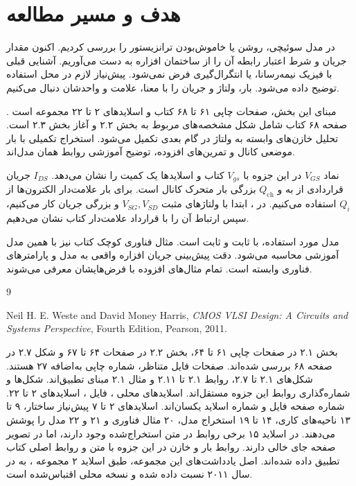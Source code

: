 \documentclass[12pt,a4paper]{article}
\newcommand{\secnum}[1]{\mbox{\beginL#1\endL}}
\begin{document}
\MakeAssignmentCover
\section*{هدف و مسیر مطالعه}
در مدل سوئیچی، روشن یا خاموش‌بودن ترانزیستور را بررسی کردیم. اکنون مقدار جریان
و شرط اعتبار رابطه آن را از ساختمان افزاره به دست می‌آوریم. آشنایی قبلی با
فیزیک نیمه‌رسانا،  یا انتگرال‌گیری فرض نمی‌شود.
پیش‌نیاز لازم در محل استفاده توضیح داده می‌شود. بار، ولتاژ و جریان را با معنا،
علامت و واحدشان دنبال می‌کنیم.

مبنای این بخش، صفحات چاپی ۶۱ تا ۶۸ کتاب و اسلایدهای ۲ تا ۲۲ مجموعه 
است \cite{weste,mos}. صفحه ۶۸ کتاب شامل شکل مشخصه‌های مربوط به بخش
\secnum{۲.۲} و آغاز بخش \secnum{۲.۳} است. تحلیل خازن‌های وابسته به ولتاژ در گام
بعدی تکمیل می‌شود. استخراج تکمیلی با بار موضعی کانال و تمرین‌های افزوده، توضیح
آموزشی روابط همان مدل‌اند.

نماد \(V_{GS}\) در این جزوه با \(V_{gs}\) کتاب و اسلایدها یک کمیت را نشان می‌دهد.
\(I_{DS}\) جریان قراردادی از  به  و \(Q_{\mathrm{ch}}\)
بزرگی بار متحرک کانال است. برای بار علامت‌دار الکترون‌ها از \(Q_i\) استفاده می‌کنیم.
در ، ابتدا با ولتاژهای مثبت \(V_{SG},V_{SD}\) و بزرگی جریان کار می‌کنیم،
سپس ارتباط آن را با قرارداد علامت‌دار کتاب نشان می‌دهیم.

مدل مورد استفاده،  با  ثابت و 
ثابت است. مثال فناوری کوچک کتاب نیز با همین مدل آموزشی محاسبه می‌شود.
دقت پیش‌بینی جریان افزاره واقعی به مدل و پارامترهای فناوری وابسته است.
تمام مثال‌های افزوده با فرض‌هایشان معرفی می‌شوند.
\tableofcontents
\clearpage


\begin{thebibliography}{9}
\begin{latin}
Neil H. E. Weste and David Money Harris,
\textit{CMOS VLSI Design: A Circuits and Systems Perspective},
Fourth Edition, Pearson, 2011.
\end{latin}
بخش \secnum{۲.۱} در صفحات چاپی ۶۱ تا ۶۴، بخش \secnum{۲.۲} در صفحات ۶۴ تا ۶۷
و شکل \secnum{۲.۷} در صفحه ۶۸ بررسی شده‌اند. صفحات فایل  متناظر، شماره
چاپی به‌اضافه ۲۷ هستند. شکل‌های \secnum{۲.۱} تا \secnum{۲.۷}، روابط
\secnum{۲.۱} تا \secnum{۲.۱۱} و مثال \secnum{۲.۱} مبنای تطبیق‌اند.
شکل‌ها و شماره‌گذاری روابط این جزوه مستقل‌اند.
اسلایدهای محلی ، فایل ، اسلایدهای
۲ تا ۲۲. شماره صفحه فایل و شماره اسلاید یکسان‌اند.
اسلایدهای ۲ تا ۷ پیش‌نیاز ساختار، ۹ تا ۱۳ ناحیه‌های کاری، ۱۴ تا ۱۹ استخراج مدل،
۲۰ مثال فناوری و ۲۱ و ۲۲ مدل  را پوشش می‌دهند.
در اسلاید ۱۵ برخی روابط در متن استخراج‌شده وجود دارند، اما در تصویر صفحه جای
خالی دارند. روابط بار و خازن در این جزوه با متن و روابط اصلی کتاب تطبیق داده شده‌اند.
اصل یادداشت‌های این مجموعه، طبق اسلاید ۲ مجموعه ، به
 در سال ۲۰۱۱ نسبت داده شده و نسخه محلی اقتباس‌شده است.
\end{thebibliography}
\end{document}
